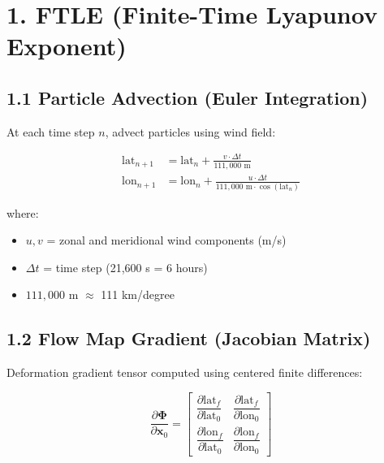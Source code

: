 \documentclass{article}
\begin{document}
\section*{1. FTLE (Finite-Time Lyapunov Exponent)}

\subsection*{1.1 Particle Advection (Euler Integration)}

At each time step $n$, advect particles using wind field:

\begin{align}
\text{lat}_{n+1} &= \text{lat}_n + \frac{v \cdot \Delta t}{111{,}000 \text{ m}} \\
\text{lon}_{n+1} &= \text{lon}_n + \frac{u \cdot \Delta t}{111{,}000 \text{ m} \cdot \cos(\text{lat}_n)}
\end{align}

where:
\begin{itemize}
    \item $u, v$ = zonal and meridional wind components (m/s)
    \item $\Delta t$ = time step (21,600 s = 6 hours)
    \item $111{,}000$ m $\approx$ 111 km/degree
\end{itemize}

\subsection*{1.2 Flow Map Gradient (Jacobian Matrix)}

Deformation gradient tensor computed using centered finite differences:

\begin{equation}
\frac{\partial \bm{\Phi}}{\partial \bm{x}_0} =
\begin{bmatrix}
\dfrac{\partial \text{lat}_f}{\partial \text{lat}_0} & \dfrac{\partial \text{lat}_f}{\partial \text{lon}_0} \\[0.5em]
\dfrac{\partial \text{lon}_f}{\partial \text{lat}_0} & \dfrac{\partial \text{lon}_f}{\partial \text{lon}_0}
\end{bmatrix}
\end{equation}
\end{document}
